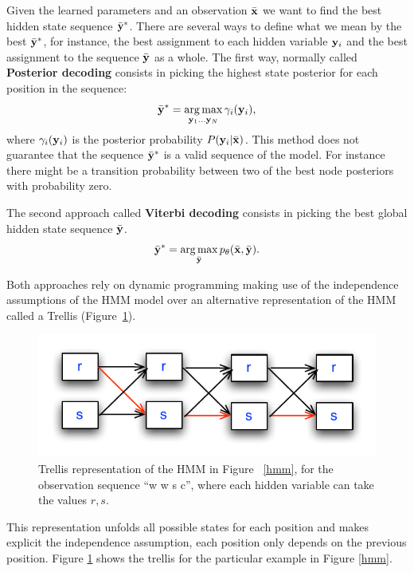 Given the learned parameters and an
observation $\bar{\mathbf{x}}$ we want to find the best hidden state sequence
$\bar{\mathbf{y}}^*$. There are several ways to define what we mean by the best
$\bar{\mathbf{y}}^*$, for instance, the best assignment to each hidden
variable $\mathbf{y}_i$ and the best assignment
to the sequence $\bar{\mathbf{y}}$ as a whole. 
The first way, normally called \textbf{Posterior decoding} consists
in picking the highest state posterior for each position in the sequence:
\begin{equation}
\bar{\mathbf{y}}^* = \operatorname*{arg\,max}_{\mathbf{y}_1 \ldots \mathbf{y}_N} \gamma_i(\mathbf{y}_i),
\end{equation}
where $\gamma_i(\mathbf{y}_i)$ is the posterior probability $P(\mathbf{y}_i|\bar{\mathbf{x}})$. 
This method does not guarantee that the sequence $\bar{\mathbf{y}}^*$ is a
valid sequence of the model. For instance there might be a transition
probability between two of the best node posteriors with probability
zero. 

The second approach called \textbf{Viterbi decoding} consists in
picking the best global hidden state sequence $\bar{\mathbf{y}}$. 
\begin{equation}
\bar{\mathbf{y}}^* = \operatorname*{arg\,max}_{\bar{\mathbf{y}}} p_{\theta}(\bar{\mathbf{x}} ,\bar{\mathbf{y}}).
\end{equation}

Both approaches rely on dynamic programming making use of the
independence assumptions of the HMM model over an alternative
representation of the HMM called a Trellis (Figure~\ref{fig:trellis}). 
\begin{figure}
\centering
\includegraphics[scale=1]{figs/sequences/trellis}
\caption[HMM Trellis representation.]{\label{fig:trellis} Trellis
  representation of the HMM in Figure ~\ref{hmm}, for the observation
  sequence ``w w s c'', where each hidden variable can take the values $r,s$.}
\end{figure}

This representation unfolds all possible states for each position and
makes explicit the independence assumption, each position only
depends on the previous position. Figure \ref{fig:trellis}  shows the
trellis for the particular example in Figure \ref{hmm}. 


